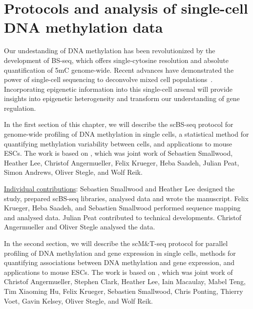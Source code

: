 \chapter{Protocols and analysis of single-cell DNA methylation data} \label{sec:pro}

\ifpdf
    \graphicspath{{Chapter3/Figs/Raster/}{Chapter3/Figs/PDF/}{Chapter3/Figs/}}
\else
    \graphicspath{{Chapter3/Figs/Vector/}{Chapter3/Figs/}}
\fi

Our undestanding of DNA methylation has been revolutionized by the development of BS-seq, which offers single-cytosine resolution and absolute quantification of 5mC genome-wide. Recent advances have demonstrated the power of single-cell sequencing to deconvolve mixed cell populations~\citep{jain_supervised_2007,deng_single-cell_2014,macaulay_single_2014}. Incorporating epigenetic information into this single-cell arsenal will provide insights into epigenetic heterogeneity and transform our understanding of gene regulation.

In the first section of this chapter, we will describe the scBS-seq protocol for genome-wide profiling of DNA methylation in single cells, a statistical method for quantifying methylation variability between cells, and applications to mouse ESCs. The work is based on \citet{smallwood_single-cell_2014}, which was joint work of Sebastien Smallwood, Heather Lee, Christof Angermueller, Felix Krueger, Heba Saadeh, Julian Peat, Simon Andrews, Oliver Stegle, and Wolf Reik.

\begin{center}
\begin{minipage}{.9\linewidth}
\underline{Individual contributions}: Sebastien Smallwood and Heather Lee designed the study, prepared scBS-seq libraries, analysed data and wrote the manuscript. Felix Krueger, Heba Saadeh, and Sebastien Smallwood performed sequence mapping and analysed data. Julian Peat contributed to technical developments. Christof Angermueller and Oliver Stegle analysed the data.
\end{minipage}
\end{center}

In the second section, we will describe the scM\&T-seq protocol for parallel profiling of DNA methylation and gene expression in single cells, methods for quantifying associations between DNA methylation and gene expression, and applications to mouse ESCs. The work is based on \citet{angermueller_parallel_2016}, which was joint work of Christof Angermueller, Stephen Clark, Heather Lee, Iain Macaulay, Mabel Teng, Tim Xiaoming Hu, Felix Krueger, Sebastien Smallwood, Chris Ponting, Thierry Voet, Gavin Kelsey, Oliver Stegle, and Wolf Reik.


